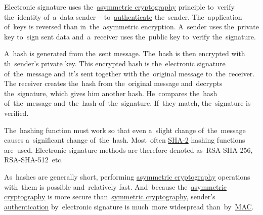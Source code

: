\label{electronicsignature}
Electronic signature uses the~\hyperref[asymmetriccryptography]{asymmetric cryptography} principle to~verify the~identity of~a~data sender -- to~\hyperref[authenticationauthorization]{authenticate} the~sender.
The~application of~keys is reversed than in~the~asymmetric encryption.
A~sender uses the~private key to~sign sent data and~a~receiver uses the~public key to~verify the~signature.

A~hash is generated from the~sent message.
The~hash is then encrypted with th~sender's private key.
This encrypted hash is the~electronic signature of~the~message and~it's sent together with the~original message to~the~receiver.
The receiver creates the~hash from the~original message and~decrypts the~signature, which gives him another hash.
He~compares the~hash of~the~message and~the~hash of~the~signature.
If~they match, the~signature is verified.

The~hashing function must work so that even a~slight change of~the~message causes a~significant change of~the~hash.
Most~often \hyperref[sha]{SHA-2} hashing functions are~used.
Electronic signature methods are therefore denoted \mbox{as RSA-SHA-256,} \mbox{RSA-SHA-512 etc.}

As~hashes are generally short, performing \hyperref[asymmetriccryptography]{asymmetric cryptography} operations with~them is possible and~relatively fast.
And~because the~\hyperref[asymmetriccryptography]{asymmetric cryptography} is more secure than~\hyperref[symmetriccryptography]{symmetric cryptography}, sender's \hyperref[authenticationauthorization]{authentication} by~electronic signature is much~more widespread than~by~\hyperref[mac]{MAC}.
